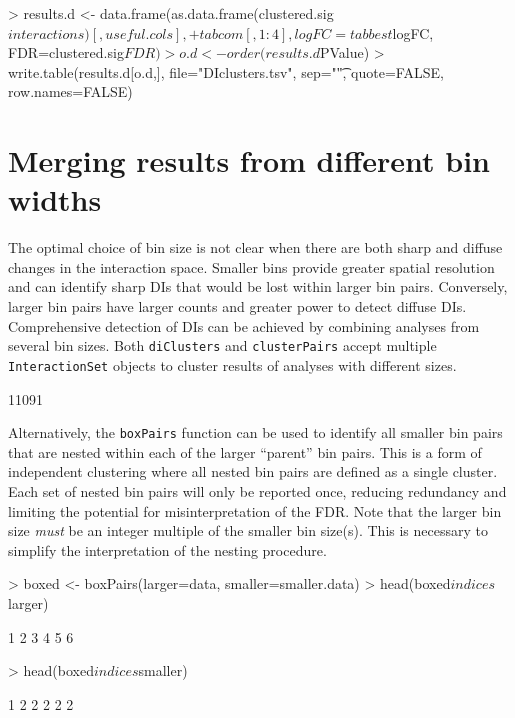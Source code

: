 \documentclass[12pt]{report}
\renewenvironment{Schunk}{\vspace{0pt}}{\vspace{0pt}}
\newcommand{\code}[1]{{\small\texttt{#1}}}
\begin{document}
\begin{Schunk}
\begin{Sinput}
> results.d <- data.frame(as.data.frame(clustered.sig$interactions)[,useful.cols],
+     tabcom[,1:4], logFC=tabbest$logFC, FDR=clustered.sig$FDR)
> o.d <- order(results.d$PValue)
> write.table(results.d[o.d,], file="DIclusters.tsv", sep="\t", quote=FALSE, row.names=FALSE)
\end{Sinput}
\end{Schunk}

\section{Merging results from different bin widths}
\label{sec:mergebins}
The optimal choice of bin size is not clear when there are both sharp and diffuse changes in the interaction space.
Smaller bins provide greater spatial resolution and can identify sharp DIs that would be lost within larger bin pairs.
Conversely, larger bin pairs have larger counts and greater power to detect diffuse DIs.
Comprehensive detection of DIs can be achieved by combining analyses from several bin sizes.
Both \code{diClusters} and \code{clusterPairs} accept multiple \code{InteractionSet} objects to cluster results of analyses with different sizes.

\begin{Schunk}
\begin{Soutput}
[1] 11091
\end{Soutput}
\end{Schunk}

Alternatively, the \code{boxPairs} function can be used to identify all smaller bin pairs that are nested within each of the larger ``parent'' bin pairs.
This is a form of independent clustering where all nested bin pairs are defined as a single cluster.
Each set of nested bin pairs will only be reported once, reducing redundancy and limiting the potential for misinterpretation of the FDR.
Note that the larger bin size \textit{must} be an integer multiple of the smaller bin size(s).
This is necessary to simplify the interpretation of the nesting procedure.

\begin{Schunk}
\begin{Sinput}
> boxed <- boxPairs(larger=data, smaller=smaller.data)
> head(boxed$indices$larger)
\end{Sinput}
\begin{Soutput}
[1] 1 2 3 4 5 6
\end{Soutput}
\begin{Sinput}
> head(boxed$indices$smaller)
\end{Sinput}
\begin{Soutput}
[1] 1 2 2 2 2 2
\end{Soutput}
\end{Schunk}
\end{document}

